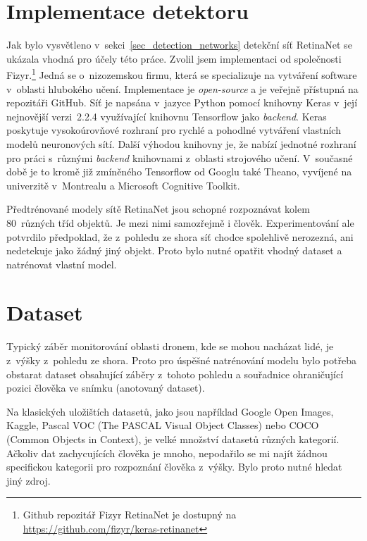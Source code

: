 \section{Implementace detektoru}
\label{sec_retinanet_implementation}

Jak bylo vysvětleno v~sekci~\ref{sec_detection_networks} detekční síť RetinaNet se ukázala vhodná pro účely této práce. Zvolil jsem implementaci od společnosti Fizyr.\footnote{Github repozitář Fizyr RetinaNet je dostupný na \url{https://github.com/fizyr/keras-retinanet}} Jedná se o~nizozemskou firmu, která se specializuje na vytváření software v~oblasti hlubokého učení. Implementace je \textit{open-source} a je veřejně přístupná na repozitáři GitHub. Síť je napsána v~jazyce Python pomocí knihovny Keras v~její nejnovější verzi~2.2.4 využívající knihovnu Tensorflow jako \textit{backend}. Keras poskytuje vysokoúrovňové rozhraní pro rychlé a pohodlné vytváření vlastních modelů neuronových sítí. Další výhodou knihovny je, že nabízí jednotné rozhraní pro práci s~různými \textit{backend} knihovnami z~oblasti strojového učení. V~současné době je to kromě již zmíněného Tensorflow od Googlu také Theano, vyvíjené na univerzitě v~Montrealu a Microsoft Cognitive Toolkit.

Předtrénované modely sítě RetinaNet jsou schopné rozpoznávat kolem 80~různých tříd objektů. Je mezi nimi samozřejmě i člověk. Experimentování ale potvrdilo předpoklad, že z~pohledu ze shora síť chodce spolehlivě nerozezná, ani nedetekuje jako žádný jiný objekt. Proto bylo nutné opatřit vhodný dataset a natrénovat vlastní model.


\section{Dataset}
\label{sec_dataset}

Typický záběr monitorování oblasti dronem, kde se mohou nacházat lidé, je z~výšky z~pohledu ze shora. Proto pro úspěšné natrénování modelu bylo potřeba obstarat dataset obsahující záběry z~tohoto pohledu a souřadnice ohraničující pozici člověka ve snímku (anotovaný dataset).

Na klasických uložištích datasetů, jako jsou například Google Open Images, Kaggle, Pascal VOC (The PASCAL Visual Object Classes) nebo COCO (Common Objects in Context), je velké množství datasetů různých kategorií. Ačkoliv dat zachycujících člověka je mnoho, nepodařilo se mi najít žádnou specifickou kategorii pro rozpoznání člověka z~výšky. Bylo proto nutné hledat jiný zdroj.

